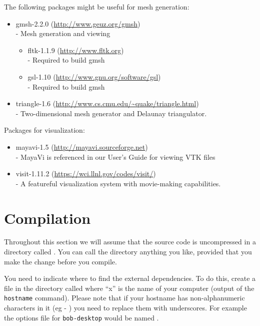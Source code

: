The following packages might be useful for mesh generation:
\begin{itemize}
 \item gmsh-2.2.0 (\url{http://www.geuz.org/gmsh}) \\-
        Mesh generation and viewing
  \begin{itemize}
   \item fltk-1.1.9 (\url{http://www.fltk.org}) \\-
        Required to build gmsh 
   \item gsl-1.10 (\url{http://www.gnu.org/software/gsl}) \\-
        Required to build gmsh 
  \end{itemize}
 \item triangle-1.6 (\url{http://www.cs.cmu.edu/~quake/triangle.html}) \\-
        Two-dimensional mesh generator and Delaunay triangulator.
\end{itemize}

Packages for visualization:
\begin{itemize}
 \item mayavi-1.5 (\url{http://mayavi.sourceforge.net}) \\-
        MayaVi is referenced in our User's Guide for viewing VTK files
 \item visit-1.11.2 (\url{https://wci.llnl.gov/codes/visit/}) \\-
        A featureful visualization system with movie-making capabilities.
\end{itemize}

\section{Compilation}\label{sec:compilesrc}
Throughout this section we will assume that the source code is uncompressed in a directory called .
You can call the directory anything you like, provided that you make the change before you compile.

You need to indicate where to find the external dependencies.
To do this, create a file in the  directory called  where ``x'' is the name of your computer (output of the \texttt{hostname} command).
Please note that if your hostname has non-alphanumeric characters in it (eg - ) you need to replace them with underscores.
For example the options file for \texttt{bob-desktop} would be named .

